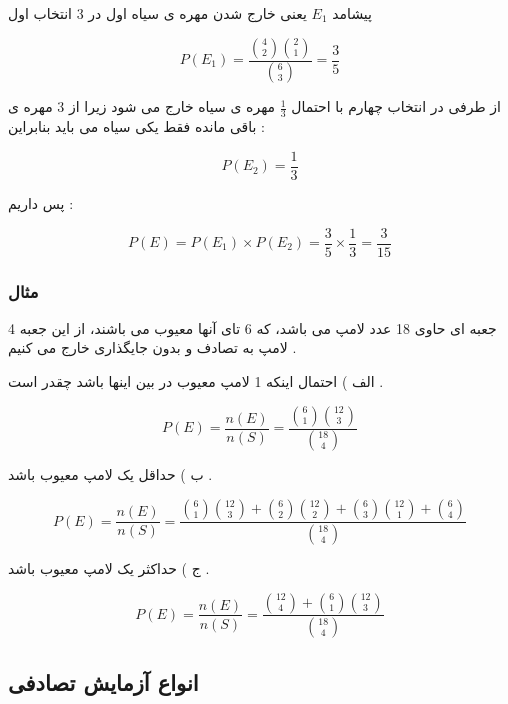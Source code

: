 \documentclass[12pt]{book}
\begin{document}
پیشامد $ E_{1}$ یعنی خارج شدن مهره ی سیاه اول در 3 انتخاب اول 

$$
P(E_{1}) = \frac{\binom{4}{2}\binom{2}{1}}{\binom{6}{3}} = \frac{3}{5}
$$


از طرفی در انتخاب چهارم با احتمال $ \frac{1}{3}$ مهره ی سیاه خارج می شود زیرا از 3 مهره ی باقی مانده فقط یکی سیاه می باید بنابراین :



$$
P(E_{2}) = \frac{1}{3}
$$

پس داریم :

$$
P(E) = P(E_{1}) \times P(E_{2}) = \frac{3}{5} \times \frac{1}{3} = \frac{3}{15}
$$


\subsubsection{مثال}
جعبه ای حاوی 18 عدد لامپ می باشد، که 6 تای آنها معیوب می باشند، از این جعبه 4 لامپ به تصادف و بدون جایگذاری خارج می کنیم .



الف ) احتمال اینکه 1 لامپ معیوب در بین اینها باشد چقدر است .

$$
P(E) = \frac{n(E)}{n(S)} = \frac{\binom{6}{1}\binom{12}{3}}{\binom{18}{4}}
$$

ب ) حداقل یک لامپ معیوب باشد .

$$
P(E) = \frac{n(E)}{n(S)} = \frac{
\binom{6}{1}\binom{12}{3} + 
\binom{6}{2}\binom{12}{2} + 
\binom{6}{3}\binom{12}{1} + 
\binom{6}{4}}{\binom{18}{4}}
$$


ج ) حداکثر یک لامپ معیوب باشد .

$$
P(E) = \frac{n(E)}{n(S)} = \frac{
\binom{12}{4} + 
\binom{6}{1}\binom{12}{3}}{\binom{18}{4}}
$$


\subsection{انواع آزمایش تصادفی}
\end{document}
